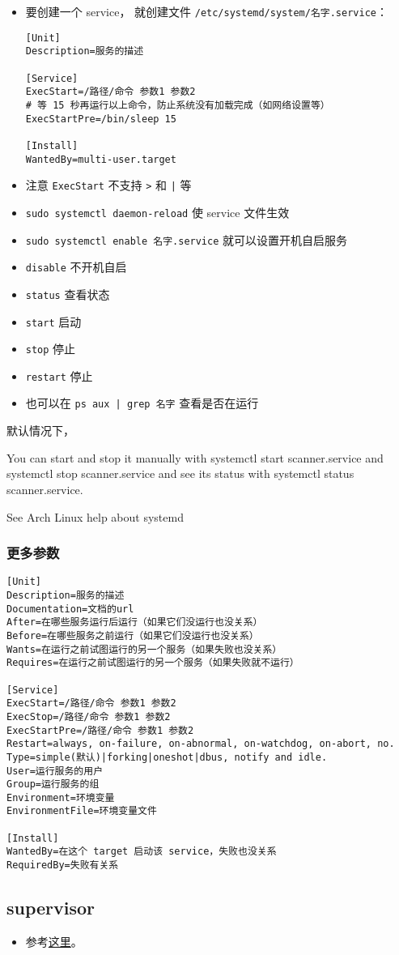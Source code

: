 
\begin{issues}
\issueDraft
\end{issues}

\begin{itemize}
\item 要创建一个 service， 就创建文件 \verb|/etc/systemd/system/名字.service|：
\begin{lstlisting}[language=none,caption=名字.service]
[Unit]
Description=服务的描述

[Service]
ExecStart=/路径/命令 参数1 参数2
# 等 15 秒再运行以上命令，防止系统没有加载完成（如网络设置等）
ExecStartPre=/bin/sleep 15

[Install]
WantedBy=multi-user.target
\end{lstlisting}
\item 注意 \verb|ExecStart| 不支持 \verb|>| 和 \verb`|` 等
\item \verb|sudo systemctl daemon-reload| 使 service 文件生效
\item \verb|sudo systemctl enable 名字.service| 就可以设置开机自启服务
\item \verb|disable| 不开机自启
\item \verb|status| 查看状态
\item \verb|start| 启动
\item \verb|stop| 停止
\item \verb|restart| 停止
\item 也可以在 \verb`ps aux | grep 名字` 查看是否在运行
\end{itemize}

默认情况下，

You can start and stop it manually with systemctl start scanner.service and systemctl stop scanner.service and see its status with systemctl status scanner.service.

See Arch Linux help about systemd

\subsubsection{更多参数}
\begin{lstlisting}[language=none,caption=名字.service]
[Unit]
Description=服务的描述
Documentation=文档的url
After=在哪些服务运行后运行（如果它们没运行也没关系）
Before=在哪些服务之前运行（如果它们没运行也没关系）
Wants=在运行之前试图运行的另一个服务（如果失败也没关系）
Requires=在运行之前试图运行的另一个服务（如果失败就不运行）

[Service]
ExecStart=/路径/命令 参数1 参数2
ExecStop=/路径/命令 参数1 参数2
ExecStartPre=/路径/命令 参数1 参数2
Restart=always, on-failure, on-abnormal, on-watchdog, on-abort, no.
Type=simple(默认)|forking|oneshot|dbus, notify and idle.
User=运行服务的用户
Group=运行服务的组
Environment=环境变量
EnvironmentFile=环境变量文件

[Install]
WantedBy=在这个 target 启动该 service，失败也没关系
RequiredBy=失败有关系
\end{lstlisting}


\subsection{supervisor}
\begin{itemize}
\item 参考\href{https://www.digitalocean.com/community/tutorials/how-to-install-and-manage-supervisor-on-ubuntu-and-debian-vps}{这里}。
\end{itemize}
